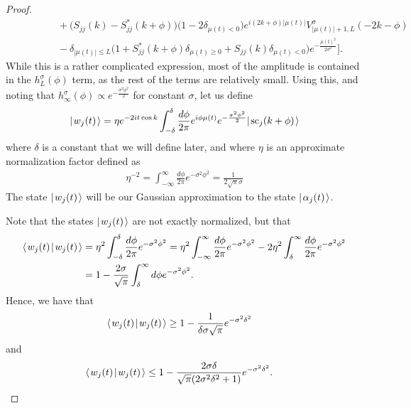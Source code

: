 \documentclass[../thesis-main/thesis-main]{subfiles}
\begin{document}
\begin{proof}
\begin{align}
 & \qquad \qquad + \big(S_{jj}(k) - S_{jj}^*(k+\phi)\big)\big(1 - 2\delta_{\mu(t) < 0}\big)e^{i(2k+\phi)|\mu(t)|} V_{|\mu(t)| + 1,L}^\sigma(-2k-\phi)\nonumber\\
  &\qquad\qquad  - \delta_{|\mu(t)| \leq L} \Big(1 + S_{jj}^*(k+\phi) \delta_{\mu(t)\geq 0} + S_{jj}(k) \delta_{\mu(t)< 0}\Big)e^{-\frac{\mu(t)^2}{2\sigma^2}} \Bigg].
\end{align} 
While this is a rather complicated expression, most of the amplitude is contained in the $h_L^\sigma(\phi)$ term, as the rest of the terms are relatively small.  Using this, and noting that $h_\infty^\sigma(\phi) \propto e^{-\frac{\sigma^2\phi^2}{2}}$ for constant $\sigma$, let us define
\begin{align}
  |\mspace{2mu} w_j(t) \mspace{2mu} \rangle = \eta e^{- 2 i t \cos k}\int_{-\delta}^{\delta} \frac{d\phi}{2\pi} e^{ i \phi \mu(t)} e^{-\frac{\sigma^2\phi^2}{2}}|\mspace{2mu} \text{sc}_{j}(k+\phi) \mspace{2mu} \rangle \label{eq:gaussian_w_defn}
\end{align}
where $\delta$ is a constant that we will define later, and where $\eta$ is an approximate normalization factor defined as
\begin{align}
  \eta^{-2} = \int_{-\infty}^{\infty} \frac{d\phi}{2\pi} e^{-\sigma^2\phi^2} = \frac{1}{2 \sqrt{\pi} \sigma}
\end{align}
The state $|\mspace{2mu} w_j(t) \mspace{2mu} \rangle$ will be our Gaussian approximation to the state $|\mspace{2mu} \alpha_j(t) \mspace{2mu} \rangle$.  

Note that the states $|\mspace{2mu} w_j(t) \mspace{2mu} \rangle$ are not exactly normalized, but that 
\begin{align}
  \langle\mspace{2mu} w_j(t) \mspace{2mu} | \mspace{2mu} w_j(t)\mspace{2mu} \rangle &= \eta^2  \int_{-\delta}^\delta \frac{d\phi}{2\pi}  e^{-\sigma^2\phi^2} =  \eta^2  \int_{-\infty}^\infty \frac{d\phi}{2\pi}  e^{-\sigma^2\phi^2} - 2 \eta^2 \int_{\delta}^\infty \frac{d\phi}{2\pi} e^{-\sigma^2 \phi^2} \\
  &= 1 - \frac{2 \sigma}{\sqrt{\pi}} \int_{\delta}^\infty d\phi e^{-\sigma^2\phi^2}.
\end{align}
Hence, we have that
\begin{align}
  \langle\mspace{2mu} w_j(t) \mspace{2mu} | \mspace{2mu} w_j(t)\mspace{2mu} \rangle & \geq 1 - \frac{1}{\delta \sigma \sqrt{\pi}} e^{-\sigma^2\delta^2}
\end{align}
and
\begin{align}
  \langle\mspace{2mu} w_j(t) \mspace{2mu} | \mspace{2mu} w_j(t)\mspace{2mu} \rangle & \leq 1 - \frac{ 2\sigma \delta}{\sqrt{\pi}(2 \sigma^2 \delta^2 + 1)}e^{- \sigma^2 \delta^2}.
\end{align}


\end{proof}
\end{document}
